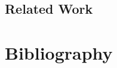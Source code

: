 \documentclass{report}
\begin{document}
\section{Related Work}
\label{sec:related work}

\vspace{0.5cm}
\chapter{Bibliography}
\label{sec:bibliography}

\printbibliography[heading=none]

\end{document}
